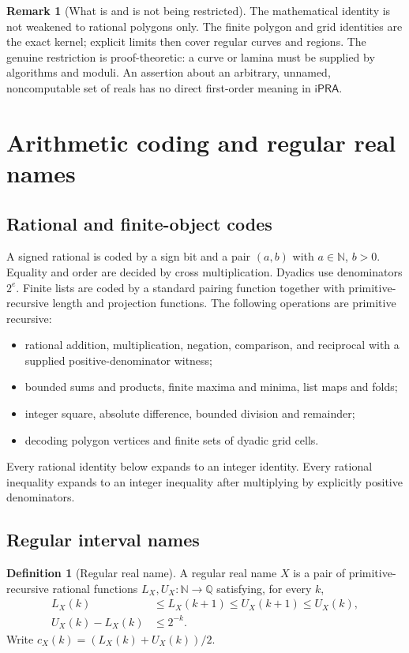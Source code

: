\documentclass[11pt]{article}
\theoremstyle{definition}
\newtheorem{definition}[theorem]{Definition}
\newtheorem{remark}[theorem]{Remark}
\newcommand{\N}{\mathbb N}
\newcommand{\Q}{\mathbb Q}
\newcommand{\ipra}{\mathsf{iPRA}}
\begin{document}
\begin{remark}[What is and is not being restricted]
The mathematical identity is not weakened to rational polygons only.  The
finite polygon and grid identities are the exact kernel; explicit limits then
cover regular curves and regions.  The genuine restriction is proof-theoretic:
a curve or lamina must be supplied by algorithms and moduli.  An assertion
about an arbitrary, unnamed, noncomputable set of reals has no direct
first-order meaning in \(\ipra\).
\end{remark}

\section{Arithmetic coding and regular real names}
\label{sec:reals}

\subsection{Rational and finite-object codes}

A signed rational is coded by a sign bit and a pair \((a,b)\) with
\(a\in\N\), \(b>0\).  Equality and order are decided by cross multiplication.
Dyadics use denominators \(2^e\).  Finite lists are coded by a standard pairing
function together with primitive-recursive length and projection functions.
The following operations are primitive recursive:
\begin{itemize}[leftmargin=2em]
\item rational addition, multiplication, negation, comparison, and reciprocal
with a supplied positive-denominator witness;
\item bounded sums and products, finite maxima and minima, list maps and folds;
\item integer square, absolute difference, bounded division and remainder;
\item decoding polygon vertices and finite sets of dyadic grid cells.
\end{itemize}
Every rational identity below expands to an integer identity.  Every rational
inequality expands to an integer inequality after multiplying by explicitly
positive denominators.

\subsection{Regular interval names}

\begin{definition}[Regular real name]
A regular real name \(X\) is a pair of primitive-recursive rational functions
\(L_X,U_X:\N\to\Q\) satisfying, for every \(k\),
\begin{align*}
 L_X(k)&\leq L_X(k+1)\leq U_X(k+1)\leq U_X(k),\\
 U_X(k)-L_X(k)&\leq2^{-k}.
\end{align*}
Write \(c_X(k)=(L_X(k)+U_X(k))/2\).
\end{definition}
\end{document}
